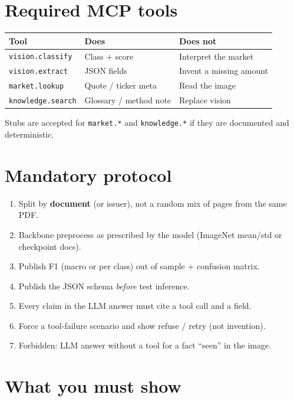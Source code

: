 \documentclass[11pt,a4paper]{article}
\begin{document}
\section{Required MCP tools}

\begin{center}
\renewcommand{\arraystretch}{1.2}
\begin{tabular}{@{}llp{7.6cm}@{}}
\toprule
\textbf{Tool} & \textbf{Does} & \textbf{Does not} \\
\midrule
\texttt{vision.classify} & Class + score & Interpret the market \\
\texttt{vision.extract} & JSON fields & Invent a missing amount \\
\texttt{market.lookup} & Quote / ticker meta & Read the image \\
\texttt{knowledge.search} & Glossary / method note & Replace vision \\
\bottomrule
\end{tabular}
\end{center}

Stubs are accepted for \texttt{market.*} and \texttt{knowledge.*} if they are
documented and deterministic.

\section{Mandatory protocol}

\begin{enumerate}
  \item Split by \textbf{document} (or issuer), not a random mix of pages from the same PDF.
  \item Backbone preprocess as prescribed by the model (ImageNet mean/std or checkpoint docs).
  \item Publish F1 (macro or per class) out of sample + confusion matrix.
  \item Publish the JSON schema \emph{before} test inference.
  \item Every claim in the LLM answer must cite a tool call and a field.
  \item Force a tool-failure scenario and show refuse / retry (not invention).
  \item Forbidden: LLM answer without a tool for a fact ``seen'' in the image.
\end{enumerate}

\section{What you must show}
\end{document}
